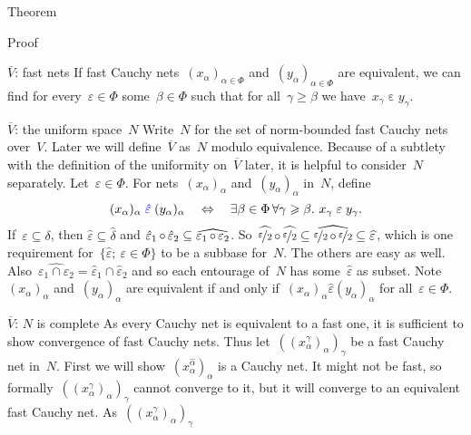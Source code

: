 \documentclass[b]{subfiles}
\begin{document}
\begin{parsec}
\begin{point}{Theorem}
\begin{point}{Proof}
\begin{point}{$\overline{V}$: fast nets}
If fast Cauchy nets~$(x_\alpha)_{\alpha \in \Phi}$
    and~$(y_\alpha)_{\alpha \in \Phi}$ are equivalent,
    we can find for every~$\varepsilon \in \Phi$
    some~$\beta \in \Phi$
    such that for all~$\gamma \geq \beta$
    we have~$x_\gamma \mathrel{\varepsilon} y_\gamma$.
\end{point}
\begin{point}{$\overline{V}$: the uniform space~$N$}%
Write~$N$ for the set of norm-bounded fast Cauchy nets over~$V$.
Later we will define~$\overline{V}$ as~$N$ modulo equivalence.
Because of a subtlety with the definition of the uniformity
    on~$\overline{V}$ later,
    it is helpful to consider~$N$ separately.
Let~$\varepsilon \in \Phi$.
For nets~$(x_\alpha)_{\alpha}$
    and~$(y_\alpha)_{\alpha}$ in~$N$,
    define
    \begin{equation*}
        (x_\alpha)_\alpha \mathrel{\Define{\hat\varepsilon}}
            (y_\alpha)_\alpha
            \quad\Leftrightarrow\quad
        \exists \beta \in \Phi \, \forall \gamma \geq \beta. \ 
        x_\gamma \mathrel{\varepsilon} y_\gamma.
    \end{equation*}
If~$\varepsilon \subseteq \delta$,
then $\hat\varepsilon \subseteq \hat\delta$
and
$\hat\varepsilon_1 \mathop{\circ} \hat\varepsilon_2 
\subseteq\widehat{\varepsilon_1 \mathop{\circ} \varepsilon_2}$.
So~$
\widehat{\nicefrac{\varepsilon}{2}} \mathop{\circ}
\widehat{\nicefrac{\varepsilon}{2}} \subseteq
\widehat{\nicefrac{\varepsilon}{2} \mathop{\circ}
\nicefrac{\varepsilon}{2}} \subseteq \widehat{\varepsilon}$,
which is one requirement for~$\{ \hat\varepsilon; \ \varepsilon \in \Phi\}$
to be a subbase for~$N$.
The others are easy as well. 
Also~$\widehat{\varepsilon_1 \cap \varepsilon_2} = \hat{\varepsilon}_1
    \cap \hat{\varepsilon}_2$
    and so each entourage of~$N$ has some~$\hat\varepsilon$ as subset.
Note~$(x_\alpha)_\alpha$ and~$(y_\alpha)_\alpha$
are equivalent if and only if~$(x_\alpha)_\alpha \mathrel{\hat\varepsilon}
    (y_\alpha)_\alpha$ for all~$\varepsilon \in \Phi$.
\end{point}
\begin{point}{$\overline{V}$: $N$ is complete}%
As every Cauchy net is equivalent to a fast one,
it is sufficient to show convergence of fast Cauchy nets.
Thus let~$((x^\gamma_\alpha)_\alpha)_\gamma$
    be a fast Cauchy net in~$N$.
First we will show~$(x^{\hat\alpha}_\alpha)_\alpha$
    is a Cauchy net.
It might not be fast, so
    formally~$((x^\gamma_\alpha)_\alpha)_\gamma$
    cannot converge to it,
    but it will converge to an equivalent fast Cauchy net.
As~$((x^\gamma_\alpha)_\alpha)_\gamma$

\end{point}
\end{point}
\end{point}
\end{parsec}
\end{document}
